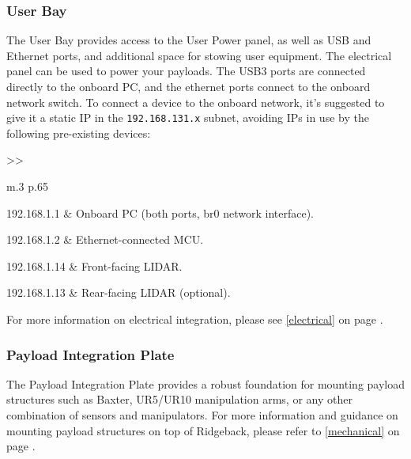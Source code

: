 \documentclass[]{clearpath-latex/clearpath-manual}
\begin{document}
\pagebreak[4]
\subsubsection{User Bay}\label{user_bay}

The User Bay provides access to the User Power panel, as well as USB and Ethernet ports, and additional space for stowing user equipment.  The electrical panel can be used to power your payloads. The USB3 ports are connected directly to the onboard PC, and the ethernet ports connect to the onboard network switch. To connect a device to the onboard network, it's suggested to give it a static IP in the \lstinline{192.168.131.x} subnet, avoiding IPs in use by the following pre-existing devices:

\bgroup
\def\arraystretch{1.2}%
\begin{table}[h]
	\centering
	\begin{tabular}{>{}>{\raggedright}m{.3\textwidth} p{.65\textwidth}} \hline

	192.168.1.1 & Onboard PC (both ports, br0 network interface). \\ \hline

	192.168.1.2 & Ethernet-connected MCU. \\ \hline

	192.168.1.14 & Front-facing LIDAR. \\ \hline

	192.168.1.13 & Rear-facing LIDAR (optional). \\ \hline

	\end{tabular}
\newline
\caption{Ridgeback Onboard Network Devices}
\label{netdevs}
\end{table}
\egroup

For more information on electrical integration, please see \autoref{electrical} on page \pageref{electrical}.


\subsubsection{Payload Integration Plate}

The Payload Integration Plate provides a robust foundation for mounting payload structures such as Baxter, UR5/UR10 manipulation arms, or any other combination of sensors and manipulators.   For more information and guidance on mounting payload structures on top of Ridgeback, please refer to \autoref{mechanical} on page \pageref{mechanical}.
\end{document}
